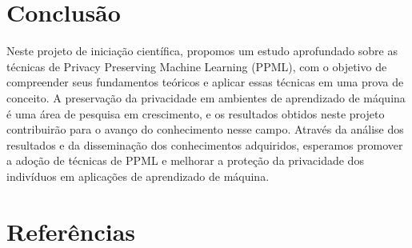 \documentclass{article}
\begin{document}
\section{Conclusão}
Neste projeto de iniciação científica, propomos um estudo aprofundado sobre as técnicas de Privacy Preserving Machine Learning (PPML), com o objetivo de compreender seus fundamentos teóricos e aplicar essas técnicas em uma prova de conceito. A preservação da privacidade em ambientes de aprendizado de máquina é uma área de pesquisa em crescimento, e os resultados obtidos neste projeto contribuirão para o avanço do conhecimento nesse campo. Através da análise dos resultados e da disseminação dos conhecimentos adquiridos, esperamos promover a adoção de técnicas de PPML e melhorar a proteção da privacidade dos indivíduos em aplicações de aprendizado de máquina.

\section{Referências}
\end{document}
